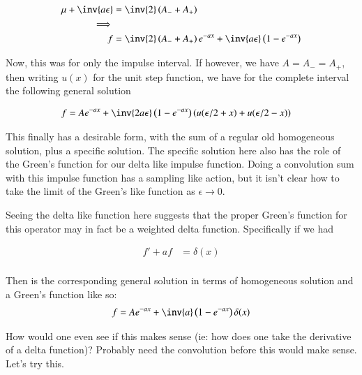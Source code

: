 \begin{align*}
\mu + \inv{a\epsilon} &= \inv{2}\left(A_{-} + A_{+}\right) \\
\implies \\
f &= \inv{2}\left(A_{-} + A_{+}\right) e^{-ax} + \inv{a \epsilon} \left(1 - e^{-a x}\right)
\end{align*}

Now, this was for only the impulse interval.  If however, we have $A = A_{-} = A_{+}$, then writing $u(x)$ for the unit step function, we have for the complete interval the following general solution

\begin{align*}
f &= A e^{-ax} + \inv{2 a \epsilon} \left(1 - e^{-a x}\right)\left( u(\epsilon/2 + x) + u(\epsilon/2 -x)\right)
\end{align*}

This finally has a desirable form, with the sum of a regular old homogeneous solution, plus a specific solution.  The specific solution here also has the role of the Green's function for our delta like impulse function.  Doing a convolution sum with this impulse function has a sampling like action, but it isn't clear how to take the limit of the Green's like function as $\epsilon \rightarrow 0$.

Seeing the delta like function here suggests that the proper Green's function for this operator may in fact be a weighted delta function.  Specifically if we had

\begin{align*}
f' + a f &= \delta(x) \\
\end{align*}

Then is the corresponding general solution in terms of homogeneous solution and a Green's function like so:
\begin{align*}
f &= A e^{-ax} + \inv{a} \left(1 - e^{-a x}\right) \delta(x) \\
\end{align*}

How would one even see if this makes sense (ie: how does one take the derivative of a delta function)?  Probably need the convolution before this would make sense.  Let's try this.

%
%

%
